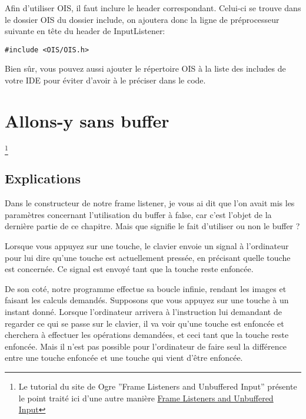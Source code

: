 Afin d'utiliser OIS, il faut inclure le header correspondant. Celui-ci se trouve dans le dossier OIS du dossier include, on ajoutera donc la ligne de préprocesseur suivante en tête du header de InputListener:

\begin{lstlisting}[caption={Include OIS}]
#include <OIS/OIS.h>
\end{lstlisting}

Bien s\^ur, vous pouvez aussi ajouter le répertoire OIS à la liste des includes de votre IDE pour éviter d'avoir à le préciser dans le code.




























\section{Allons-y sans buffer}\footnote{Le tutorial du site de Ogre ''Frame Listeners and Unbuffered Input'' présente le point traité ici d'une autre manière \href{http://www.ogre3d.org/tikiwiki/Basic+Tutorial+4}{Frame Listeners and Unbuffered Input}}
\subsection{Explications}
Dans le constructeur de notre frame listener, je vous ai dit que l'on avait mis les paramètres concernant l'utilisation du buffer à false, car c'est l'objet de la dernière partie de ce chapitre. Mais que signifie le fait d'utiliser ou non le buffer ?

Lorsque vous appuyez sur une touche, le clavier envoie un signal à l'ordinateur pour lui dire qu'une touche est actuellement pressée, en précisant quelle touche est concernée. Ce signal est envoyé tant que la touche reste enfoncée.

De son coté, notre programme effectue sa boucle infinie, rendant les images et faisant les calculs demandés. Supposons que vous appuyez sur une touche à un instant donné. Lorsque l'ordinateur arrivera à l'instruction lui demandant de regarder ce qui se passe sur le clavier, il va voir qu'une touche est enfoncée et cherchera à effectuer les opérations demandées, et ceci tant que la touche reste enfoncée. Mais il n'est pas possible pour l'ordinateur de faire seul la différence entre une touche enfoncée et une touche qui vient d'être enfoncée.

